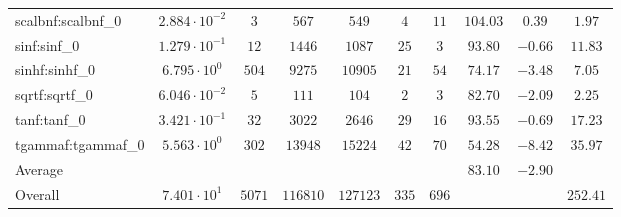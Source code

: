 \begin{tabular}{|l|c|c|c|c|c|c|c|c|c|}
scalbnf:scalbnf\_0       & $ 2.884 \cdot 10^{-2} $ & $ 3      $ & $ 567    $ & $ 549    $ & $ 4   $ & $ 11  $ & $ 104.03      $ & $ 0.39    $ & $ 1.97    $ \\
sinf:sinf\_0             & $ 1.279 \cdot 10^{-1} $ & $ 12     $ & $ 1446   $ & $ 1087   $ & $ 25  $ & $ 3   $ & $ 93.80       $ & $ -0.66   $ & $ 11.83   $ \\
sinhf:sinhf\_0           & $ 6.795 \cdot 10^{0}  $ & $ 504    $ & $ 9275   $ & $ 10905  $ & $ 21  $ & $ 54  $ & $ 74.17       $ & $ -3.48   $ & $ 7.05    $ \\
sqrtf:sqrtf\_0           & $ 6.046 \cdot 10^{-2} $ & $ 5      $ & $ 111    $ & $ 104    $ & $ 2   $ & $ 3   $ & $ 82.70       $ & $ -2.09   $ & $ 2.25    $ \\
tanf:tanf\_0             & $ 3.421 \cdot 10^{-1} $ & $ 32     $ & $ 3022   $ & $ 2646   $ & $ 29  $ & $ 16  $ & $ 93.55       $ & $ -0.69   $ & $ 17.23   $ \\
tgammaf:tgammaf\_0       & $ 5.563 \cdot 10^{0}  $ & $ 302    $ & $ 13948  $ & $ 15224  $ & $ 42  $ & $ 70  $ & $ 54.28       $ & $ -8.42   $ & $ 35.97   $ \\
\hline
Average                  & $                     $ & $        $ & $        $ & $        $ & $     $ & $     $ & $ 83.10       $ & $ -2.90   $ & $         $ \\
\hline
Overall                  & $ 7.401 \cdot 10^{1}  $ & $ 5071   $ & $ 116810 $ & $ 127123 $ & $ 335 $ & $ 696 $ & $             $ & $         $ & $ 252.41  $ \\
\hline
\end{tabular}
